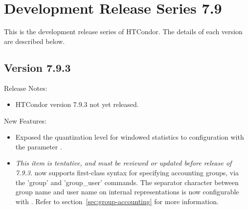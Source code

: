
\section{\label{sec:History-7-9}Development Release Series 7.9}

This is the development release series of HTCondor.
The details of each version are described below.

\subsection*{\label{sec:New-7-9-3}Version 7.9.3}

\noindent Release Notes:

\begin{itemize}

\item HTCondor version 7.9.3 not yet released.

\end{itemize}


\noindent New Features:

\begin{itemize}

\item Exposed the quantization level for windowed statistics to
configuration with the parameter .

\item \emph{This item is tentative, and must be reviewed or updated
before release of 7.9.3.}
 now supports first-class syntax for specifying
accounting groups, via the 'group' and 'group\_user' commands.  The
separator character between group name and user name on internal
representations is now configurable with .
Refer to section~\ref{sec:group-accounting} for more information.


\end{itemize}

